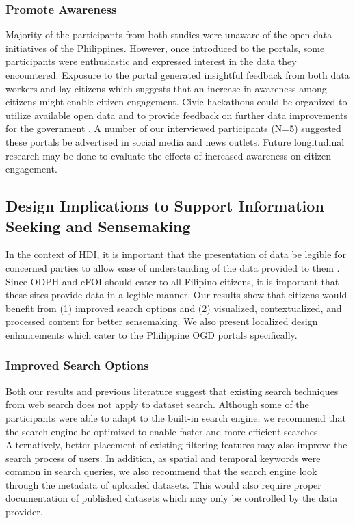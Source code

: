 \documentclass{sigchi}
\begin{document}
\subsubsection{Promote Awareness}
Majority of the participants from both studies were unaware of the open data initiatives of the Philippines. However, once introduced to the portals, some participants were enthusiastic and expressed interest in the data they encountered. Exposure to the portal generated insightful feedback from both data workers and lay citizens which suggests that an increase in awareness among citizens might enable citizen engagement. Civic hackathons could be organized to utilize available open data and to provide feedback on further data improvements for the government \cite{Robinson2016}. A number of our interviewed participants (N=5) suggested these portals be advertised in social media and news outlets. Future longitudinal research may be done to evaluate the effects of increased awareness on citizen engagement.

\subsection{Design Implications to Support Information Seeking and Sensemaking}
In the context of HDI, it is important that the presentation of data be legible for concerned parties to allow ease of understanding of the data provided to them \cite{Mortier2014}. Since ODPH and eFOI should cater to all Filipino citizens, it is important that these sites provide data in a legible manner. Our results show that citizens would benefit from (1) improved search options and (2) visualized, contextualized, and processed content for better sensemaking. We also present localized design enhancements which cater to the Philippine OGD portals specifically.

\subsubsection{Improved Search Options}
Both our results and previous literature \cite{kacprzak2019characterising} suggest that existing search techniques from web search does not apply to dataset search. Although some of the participants were able to adapt to the built-in search engine, we recommend that the search engine be optimized to enable faster and more efficient searches. Alternatively, better placement of existing filtering features may also improve the search process of users. In addition, as spatial and temporal keywords were common in search queries, we also recommend that the search engine look through the metadata of uploaded datasets. This would also require proper documentation of published datasets which may only be controlled by the data provider.
\end{document}

